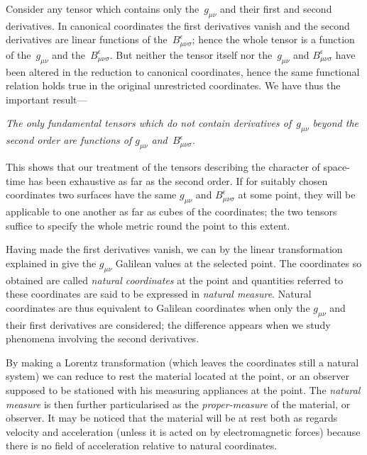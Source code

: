 \documentclass[12pt]{book}
\begin{document}
Consider any tensor which contains only the~$g_{\mu\nu}$ and their first and second
derivatives. In canonical coordinates the first derivatives vanish and the
second derivatives are linear functions of the~$B_{\mu\nu\sigma}^{\epsilon}$; hence the whole tensor is
a function of the~$g_{\mu\nu}$ and the~$B_{\mu\nu\sigma}^{\epsilon}$. But neither the tensor itself nor the~$g_{\mu\nu}$
and $B_{\mu\nu\sigma}^{\epsilon}$ have been altered in the reduction to canonical coordinates, hence
the same functional relation holds true in the original unrestricted coordinates.
We have thus the important result---

\emph{The only fundamental tensors which do not contain derivatives of~$g_{\mu\nu}$ beyond
the second order are functions of $g_{\mu\nu}$ and~$B_{\mu\nu\sigma}^{\epsilon}$.}

This shows that our treatment of the tensors describing the character of
space-time has been exhaustive as far as the second order. If for suitably
chosen coordinates two surfaces have the same $g_{\mu\nu}$ and $B_{\mu\nu\sigma}^{\epsilon}$ at some point,
they will be applicable to one another as far as cubes of the coordinates; the
two tensors suffice to specify the whole metric round the point to this extent.

Having made the first derivatives vanish, we can by the linear transformation
explained in  give the $g_{\mu\nu}$ Galilean values at the selected point.
The coordinates so obtained are called \emph{natural coordinates} at the point and
%
%
quantities referred to these coordinates are said to be expressed in \emph{natural
measure}. Natural coordinates are thus equivalent to Galilean coordinates
when only the $g_{\mu\nu}$ and their first derivatives are considered; the difference
appears when we study phenomena involving the second derivatives.

By making a Lorentz transformation (which leaves the coordinates still
a natural system) we can reduce to rest the material located at the point, or
an observer supposed to be stationed with his measuring appliances at the
point. The \emph{natural measure} is then further particularised as the \emph{proper-measure}
of the material, or observer. It may be noticed that the material
will be at rest both as regards velocity and acceleration (unless it is acted on
by electromagnetic forces) because there is no field of acceleration relative to
natural coordinates.
\end{document}

